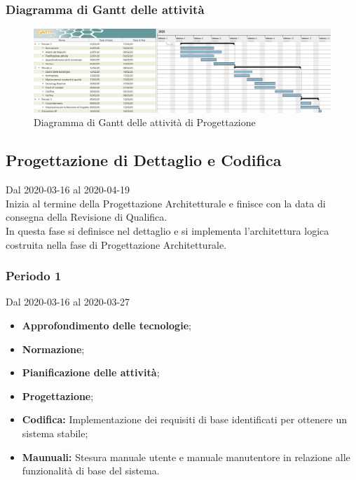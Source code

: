 \newpage
\begin{landscape}
	\subsubsection{Diagramma di Gantt delle attività}
	\pagestyle{empty}
	\begin{figure}[h]
		\caption{Diagramma di Gantt delle attività di Progettazione}
		\begin{center}	
			\includegraphics[scale=1.6]{sezioni/DiagrammiGantt/ProgettazioneArchitetturale.png}
		\end{center}
		
	\end{figure}
\end{landscape}

\subsection{Progettazione di Dettaglio e Codifica}
Dal 2020-03-16 al 2020-04-19\\
Inizia al termine della Progettazione Architetturale e finisce con la data di consegna della Revisione di Qualifica.\\
In questa fase si definisce nel dettaglio e si implementa l'architettura logica costruita nella fase di Progettazione Architetturale.\\


\subsubsection{Periodo 1} 
Dal 2020-03-16 al 2020-03-27\\
\begin{itemize}
	\item \textbf{Approfondimento delle tecnologie};
	\item \textbf{Normazione};
	\item \textbf{Pianificazione delle attività};
	\item \textbf{Progettazione};
	\item \textbf{Codifica:} Implementazione dei requisiti di base identificati per ottenere un sistema stabile;
	\item \textbf{Maunuali:} Stesura manuale utente e manuale manutentore in relazione alle funzionalità di base del sistema.
\end{itemize}
